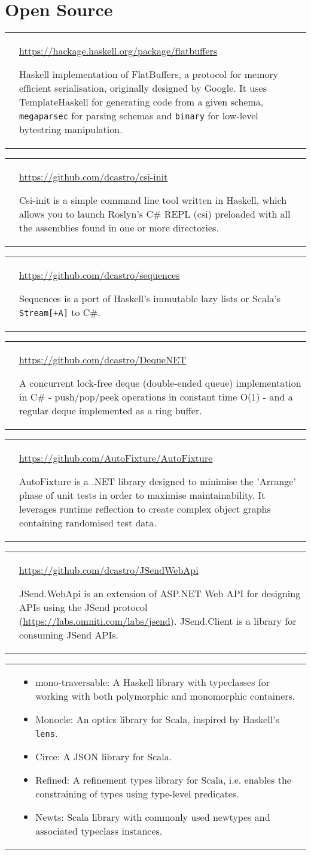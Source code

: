 \documentclass[12pt,a4paper,sans]{moderncv}        %
\makeatletter
\newcommand*{\para}{\vspace{.7ex}\newline}
\newcommand*{\project}[3]{
  \cvitem{\textbf{#1}}{
    \barelink{#2}
    \para
    #3
    }
}
\newcommand*{\code}{\texttt}
\newcommand*{\barelink}[1]{\protect\href{#1}{#1}}
\newcommand*{\cvitemspace}{1em}
\renewcommand*{\cvitem}[3][\cvitemspace]{%
  \begin{tabular}{@{}p{\hintscolumnwidth}@{\hspace{\separatorcolumnwidth}}p{\maincolumnwidth}@{}}%
    \raggedleft\hintstyle{#2} &{#3}%
  \end{tabular}%
  \par\addvspace{#1}}
\makeatother
\begin{document}
\section{Open Source}
\project{haskell-flatbuffers}{https://hackage.haskell.org/package/flatbuffers}{
  Haskell implementation of FlatBuffers, a protocol for memory efficient
  serialisation, originally designed by Google.
  It uses TemplateHaskell for generating code from a given schema,
  \code{megaparsec} for parsing schemas and \code{binary} for low-level
  bytestring manipulation.
}
\project{csi-init}{https://github.com/dcastro/csi-init}{
  Csi-init is a simple command line tool written in Haskell, which allows you to
  launch Roslyn's C\# REPL (csi) preloaded with all the assemblies found in one or
  more directories.
}
\project{sequences}{https://github.com/dcastro/sequences}{
  Sequences is a port of Haskell's immutable lazy lists or Scala's \code{Stream[+A]} to C\#.
}
\project{DequeNET}{https://github.com/dcastro/DequeNET}{
  A concurrent lock-free deque (double-ended queue) implementation in C\# -
  push/pop/peek operations in constant time O(1) - and a regular deque
  implemented as a ring buffer.
}
\project{Contributed to AutoFixture}{https://github.com/AutoFixture/AutoFixture}{
  AutoFixture is a .NET library designed to minimise the
  'Arrange' phase of unit tests in order to maximise maintainability.
  It leverages runtime reflection to create complex object graphs
  containing randomised test data.
}
\project{JSend WebApi \& Client}{https://github.com/dcastro/JSendWebApi}{
  JSend.WebApi is an extension of ASP.NET Web API for designing APIs using the
  JSend protocol (\barelink{https://labs.omniti.com/labs/jsend}).
  JSend.Client is a library for consuming JSend APIs.
}
\cvitem{\textbf{Smaller contributions}}{
  \begin{itemize}
    \item mono-traversable: A Haskell library with typeclasses for working with
    both polymorphic and monomorphic containers.
    \item Monocle: An optics library for Scala, inspired by Haskell's \code{lens}.
    \item Circe: A JSON library for Scala.
    \item Refined: A refinement types library for Scala, i.e. enables
    the constraining of types using type-level predicates.
    \item Newts: Scala library with commonly used newtypes and associated typeclass instances.
  \end{itemize}
}
\end{document}
